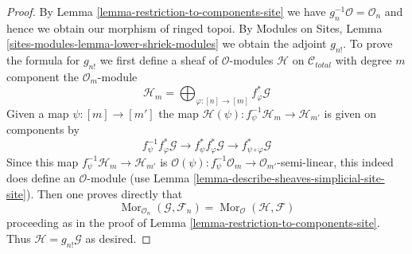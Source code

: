 \documentclass{stacks-project}
\theoremstyle{plain}
\theoremstyle{definition}
\theoremstyle{remark}
\numberwithin{equation}{subsection}
\def\Mor{\mathop{\mathrm{Mor}}\nolimits}
\begin{document}
\begin{proof}
By Lemma \ref{lemma-restriction-to-components-site} we have
$g_n^{-1}\mathcal{O} = \mathcal{O}_n$ and hence we obtain our
morphism of ringed topoi. By Modules on Sites, Lemma
\ref{sites-modules-lemma-lower-shriek-modules}
we obtain the adjoint $g_{n!}$. To prove the formula for $g_{n!}$
we first define a sheaf of $\mathcal{O}$-modules $\mathcal{H}$
on $\mathcal{C}_{total}$ with degree $m$ component
the $\mathcal{O}_m$-module
$$
\mathcal{H}_m =
\bigoplus\nolimits_{\varphi : [n] \to [m]} f_\varphi^*\mathcal{G}
$$
Given a map $\psi : [m] \to [m']$ the map
$\mathcal{H}(\psi) : f_\psi^{-1}\mathcal{H}_m \to \mathcal{H}_{m'}$
is given on components by
$$
f_\psi^{-1} f_\varphi^*\mathcal{G} \to
f_\psi^* f_\varphi^*\mathcal{G} \to
f_{\psi \circ \varphi}^*\mathcal{G}
$$
Since this map $f_\psi^{-1}\mathcal{H}_m \to \mathcal{H}_{m'}$ is
$\mathcal{O}(\psi) : f_\psi^{-1}\mathcal{O}_m \to \mathcal{O}_{m'}$-semi-linear,
this indeed does define an $\mathcal{O}$-module
(use Lemma \ref{lemma-describe-sheaves-simplicial-site-site}).
Then one proves directly that
$$
\Mor_{\mathcal{O}_n}(\mathcal{G}, \mathcal{F}_n) =
\Mor_{\mathcal{O}}(\mathcal{H}, \mathcal{F})
$$
proceeding as in the proof of Lemma \ref{lemma-restriction-to-components-site}.
Thus $\mathcal{H} = g_{n!}\mathcal{G}$ as desired.
\end{proof}
\end{document}
